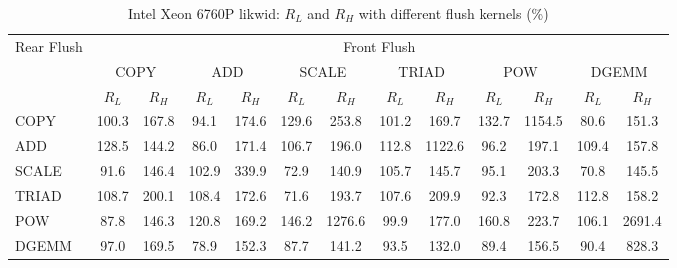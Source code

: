 \begin{table}[htbp]
\centering
\caption{Intel Xeon 6760P likwid: $R_L$ and $R_H$ with different flush kernels (\%)}
\label{tab:frkern-cgnr6760pn2-likwid}
\begin{tabular*}{\textwidth}{@{\extracolsep{\fill}}lcccccccccccc}
\toprule
\multirow{3}{*}{Rear Flush} & \multicolumn{12}{c}{Front Flush} \\ \cmidrule(lr){2-13}
& \multicolumn{2}{c}{COPY} & \multicolumn{2}{c}{ADD} & \multicolumn{2}{c}{SCALE} & \multicolumn{2}{c}{TRIAD} & \multicolumn{2}{c}{POW} & \multicolumn{2}{c}{DGEMM} \\ \cmidrule(lr){2-3} \cmidrule(lr){4-5} \cmidrule(lr){6-7} \cmidrule(lr){8-9} \cmidrule(lr){10-11} \cmidrule(lr){12-13}
& $R_L$ & $R_H$ & $R_L$ & $R_H$ & $R_L$ & $R_H$ & $R_L$ & $R_H$ & $R_L$ & $R_H$ & $R_L$ & $R_H$ \\ \midrule
COPY & 100.3 & 167.8 & 94.1 & 174.6 & 129.6 & 253.8 & 101.2 & 169.7 & 132.7 & 1154.5 & 80.6 & 151.3 \\
ADD & 128.5 & 144.2 & 86.0 & 171.4 & 106.7 & 196.0 & 112.8 & 1122.6 & 96.2 & 197.1 & 109.4 & 157.8 \\
SCALE & 91.6 & 146.4 & 102.9 & 339.9 & 72.9 & 140.9 & 105.7 & 145.7 & 95.1 & 203.3 & 70.8 & 145.5 \\
TRIAD & 108.7 & 200.1 & 108.4 & 172.6 & 71.6 & 193.7 & 107.6 & 209.9 & 92.3 & 172.8 & 112.8 & 158.2 \\
POW & 87.8 & 146.3 & 120.8 & 169.2 & 146.2 & 1276.6 & 99.9 & 177.0 & 160.8 & 223.7 & 106.1 & 2691.4 \\
DGEMM & 97.0 & 169.5 & 78.9 & 152.3 & 87.7 & 141.2 & 93.5 & 132.0 & 89.4 & 156.5 & 90.4 & 828.3 \\
\bottomrule
\end{tabular*}
\end{table}